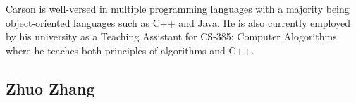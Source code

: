 Carson is well-versed in multiple programming languages with a majority being object-oriented languages such as C++ and Java. He is also currently employed by his university as a Teaching Assistant for CS-385: Computer Alogorithms where he teaches both principles of algorithms and C++.

\subsection{Zhuo Zhang}